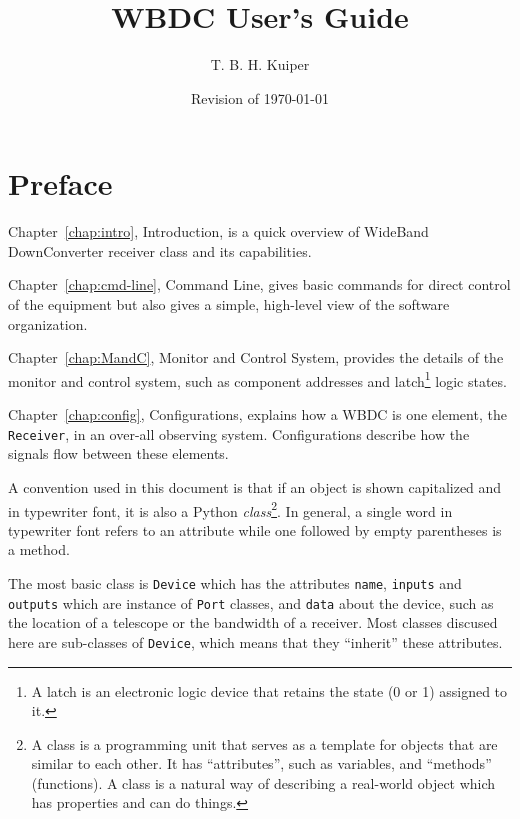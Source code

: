 \documentclass[letterpaper,11pt]{book}
\title{WBDC User's Guide}
\author{T. B. H. Kuiper}
\date{Revision of \today}
\begin{document}
\maketitle
\frontmatter
\chapter*{Preface}

Chapter~\ref{chap:intro}, Introduction, is a quick overview of WideBand 
DownConverter receiver class and its capabilities.

Chapter~\ref{chap:cmd-line}, Command Line, gives basic commands for direct 
control of the  equipment but also gives a simple, high-level view of the 
software organization.  

Chapter~\ref{chap:MandC}, Monitor and Control System, provides the details 
of the monitor and control system, such as component addresses and 
latch\footnote{A latch is an electronic logic device that retains the state
(0 or 1) assigned to it.} logic states.

Chapter~\ref{chap:config}, Configurations, explains how a WBDC is one element,
the {\tt Receiver}, in an over-all observing system.  Configurations describe 
how the signals flow between these elements.

A convention used in this document is that if an object is shown capitalized 
and in typewriter font, it is also a Python {\it class}\footnote{A class is a
programming unit that serves as a template for objects that are similar to
each other.  It has ``attributes'', such as
variables, and ``methods'' (functions). A class is a natural way of describing
a real-world object which has properties and can do things.}. In general,
a single word in typewriter font refers to an attribute while one followed by
empty parentheses is a method.

The most basic class is {\tt Device} which has the attributes 
{\tt name}, {\tt inputs} and {\tt outputs} which are instance of {\tt Port}
classes, and {\tt data} about the device, such as the location of a telescope
or the bandwidth of a receiver.  Most classes discused here are sub-classes of 
{\tt Device}, which means that they ``inherit'' these attributes.
\end{document}
